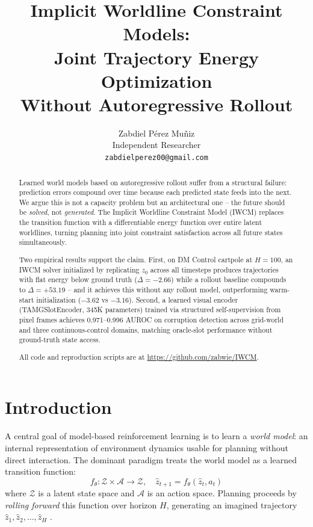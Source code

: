 \documentclass[12pt]{article}
\title{%
  \textbf{Implicit Worldline Constraint Models: \\
  Joint Trajectory Energy Optimization \\
  Without Autoregressive Rollout}
}
\author{Zabdiel P{\'e}rez Mu{\~n}iz \\ Independent Researcher \\ \texttt{zabdielperez00@gmail.com}}
\date{}
\begin{document}
\maketitle

\begin{abstract}
Learned world models based on autoregressive rollout suffer from a structural failure: prediction errors compound over time because each predicted state feeds into the next. We argue this is not a capacity problem but an architectural one -- the future should be \emph{solved}, not \emph{generated}. The Implicit Worldline Constraint Model (IWCM) replaces the transition function with a differentiable energy function over entire latent worldlines, turning planning into joint constraint satisfaction across all future states simultaneously.

Two empirical results support the claim. First, on DM Control cartpole at $H=100$, an IWCM solver initialized by replicating $z_0$ across all timesteps produces trajectories with flat energy below ground truth ($\Delta=-2.66$) while a rollout baseline compounds to $\Delta=+53.19$ -- and it achieves this without any rollout model, outperforming warm-start initialization ($-3.62$ vs $-3.16$). Second, a learned visual encoder (TAMGSlotEncoder, 345K parameters) trained via structured self-supervision from pixel frames achieves 0.971--0.996 AUROC on corruption detection across grid-world and three continuous-control domains, matching oracle-slot performance without ground-truth state access.

All code and reproduction scripts are at \url{https://github.com/zabwie/IWCM}.
\end{abstract}

\tableofcontents
\newpage

\section{Introduction}
\label{sec:intro}

A central goal of model-based reinforcement learning is to learn a \emph{world model}: an internal representation of environment dynamics usable for planning without direct interaction. The dominant paradigm treats the world model as a learned transition function:
\[
  f_\theta : \mathcal{Z} \times \mathcal{A} \to \mathcal{Z}, \quad \hat{z}_{t+1} = f_\theta(\hat{z}_t, a_t)
\]
where $\mathcal{Z}$ is a latent state space and $\mathcal{A}$ is an action space. Planning proceeds by \emph{rolling forward} this function over horizon $H$, generating an imagined trajectory $\hat{z}_1, \hat{z}_2, \ldots, \hat{z}_H$ \citep{hafner2023dreamerv3}.
\end{document}
